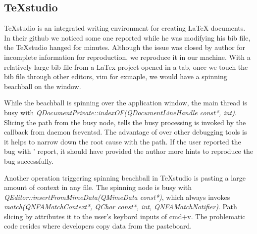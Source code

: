 \subsection{TeXstudio}

TeXstudio is an integrated writing environment for creating LaTeX documents. In
their github we noticed some one reported while he was modifying his bib file,
the TeXstudio hanged for minutes. Although the issue was closed by author for
incomplete information for reproduction, we reproduce it in our machine. With a
relatively large bib file from a LaTex project opened in a tab, once we touch
the bib file through other editors, vim for exmaple, we would have a spinning
beachball on the window.

While the beachball is spinning over the application window, the main thread
is busy with \textit{QDocumentPrivate::indexOF(QDocumentLineHandle const*,
int)}. Slicing the path from the busy node, \xxx tells the busy processing is
invoked by the callback from daemon fseventsd. The advantage of \xxx over other
debugging tools is it helps to narrow down the root cause with the
path. If the user reported the bug with \xxx' report, it should have provided
the author more hints to reproduce the bug successfully.

Another operation triggering spinning beachball in TeXstudio is pasting
a large amount of context in any file. The spinning node is busy with
\textit{QEditor::insertFromMimeData(QMimeData const*)}, which always invokes
\textit{match(QNFAMatchContext*, QChar const*, int, QNFAMatchNotifier)}. Path
slicing by \xxx attributes it to the user's keybord inputs of cmd+v. The
problematic code resides where developers copy data from the pasteboard.
